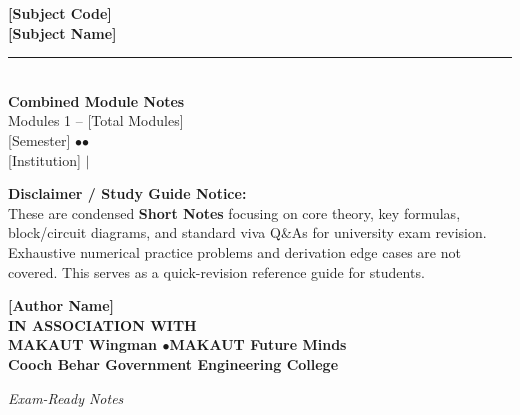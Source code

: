 \documentclass[12pt,a4paper]{article}
\begin{document}

\thispagestyle{empty}


\vspace*{1.0cm}
\begin{center}
  {\Huge\bfseries\color{myred} [Subject Code]}\\[10pt]
  {\LARGE\bfseries\color{mydark} [Subject Name]}\\[20pt]
  {\color{myred}\rule{0.7\linewidth}{1.5pt}}\\[18pt]
  {\Large\color{myteal}\textbf{Combined Module Notes}}\\[8pt]
  {\large\color{mydark} Modules 1 -- [Total Modules]}\\[40pt]
  {\normalsize\color{mydark} [Semester] \quad$\bullet$\quad [Department] \quad$\bullet$\quad [Credits]}\\[12pt]
  {\normalsize\color{mydark} [Institution] \;$|$\; [Session]}
\end{center}
\vspace{1.0cm}
\begin{center}
  \begin{tcolorbox}[colback=mygray, colframe=mgframe, boxrule=0.5pt, arc=3pt, width=0.85\linewidth]
    \centering\small\color{mydark}
    \textbf{Disclaimer / Study Guide Notice:}\\
    These are condensed \textbf{Short Notes} focusing on core theory, key formulas, block/circuit diagrams, and standard viva Q\&As for university exam revision. Exhaustive numerical practice problems and derivation edge cases are not covered. This serves as a quick-revision reference guide for students.
  \end{tcolorbox}
\end{center}
\vfill
\vspace{0.6cm}
\begin{center}
  {\large\bfseries\color{mypurple} [Author Name]}\\[16pt]
  {\footnotesize\color{watermark}\textbf{IN ASSOCIATION WITH}}\\[8pt]
  {\small\bfseries\color{mydark} MAKAUT Wingman \quad$\bullet$\quad MAKAUT Future Minds}\\[12pt]
  {\large\bfseries\color{myteal} Cooch Behar Government Engineering College}
\end{center}
\vfill
\begin{center}{\small\color{watermark}\textit{Exam-Ready Notes}}\end{center}
\clearpage
\end{document}
